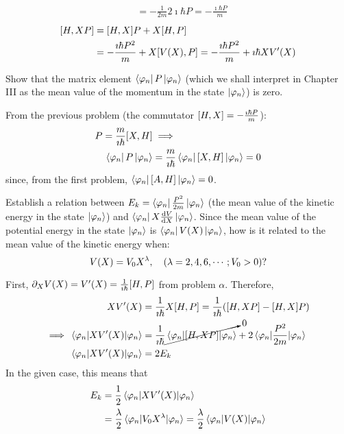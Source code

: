 \documentclass[a4paper,twoside]{article}
\begin{document}
\begin{itemize}
\begin{problem}
\begin{align}
                &= - \frac{1}{2m} 2\imath\hbar P = - \frac{\imath\hbar P}{m}
            \end{align}
            \begin{align}
                \comm{H}{XP} &= \comm{H}{X}P + X \comm{H}{P}\\
                &= - \frac{\imath\hbar P^2}{m} + X \comm{V(X)}{P} = -\frac{\imath\hbar P^2}{m} + \imath\hbar XV'(X) \\
            \end{align}
        \end{problem}
        \subitem[$\beta$.] Show that the matrix element $ \bra{\varphi_n} P \ket{\varphi_n} $ (which we shall interpret in Chapter III as the mean value of the momentum in the state $ \ket{\varphi_n} $) is zero.
        \begin{problem}
            From the previous problem (the commutator $ \comm{H}{X} = - \frac{\imath\hbar P}{m} $):
            \begin{align}
                P = \frac{m}{\imath\hbar} \comm{X}{H} &\implies\\
                \bra{\varphi_n} P \ket{\varphi_n} &= \frac{m}{\imath\hbar} \bra{\varphi_n} \comm{X}{H} \ket{\varphi_n} = 0
            \end{align}
            since, from the first problem, $ \bra{\varphi_n} \comm{A}{H} \ket{\varphi_n} = 0 $.
        \end{problem}
        \subitem[$\gamma$.] Establish a relation between $ E_k = \bra{\varphi_n} \frac{P^2}{2m} \ket{\varphi_n} $ (the mean value of the kinetic energy in the state $ \ket{\varphi_n} $) and $ \bra{\varphi_n} X \dv{V}{X} \ket{\varphi_n} $. Since the mean value of the potential energy in the state $ \ket{\varphi_n} $ is $ \bra{\varphi_n} V(X) \ket{\varphi_n} $, how is it related to the mean value of the kinetic energy when:
        \begin{equation}
            V(X) = V_0 X^{\lambda} \qc (\lambda = 2,4,6,\cdots; V_0 > 0)?
        \end{equation}
        \begin{problem}
            First, $ \partial_X V(X) = V'(X) = \frac{1}{\imath\hbar} \comm{H}{P} $ from problem $\alpha$. Therefore,
            \begin{align}
                XV'(X) &= \frac{1}{\imath\hbar}X \comm{H}{P} = \frac{1}{\imath\hbar}(\comm{H}{XP} - \comm{H}{X}P)\\
                \implies \ev{XV'(X)}{\varphi_n} &= \frac{1}{\imath\hbar}\cancelto{0}{\ev{\comm{H}{XP}}{\varphi_n}} + 2\ev{\frac{P^2}{2m}}{\varphi_n}\\
                \ev{XV'(X)}{\varphi_n} &= 2E_k
            \end{align}
            In the given case, this means that
            \begin{align}
                E_k &= \frac{1}{2} \ev{XV'(X)}{\varphi_n}\\
                &= \frac{\lambda}{2} \ev{V_0X^{\lambda}}{\varphi_n} = \frac{\lambda}{2} \ev{V(X)}{\varphi_n}
            \end{align}
        \end{problem}
\end{itemize}
\end{document}
